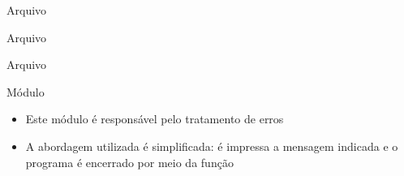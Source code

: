 \begin{frame}[fragile]{Arquivo }
\end{frame}

\begin{frame}[fragile]{Arquivo }
\end{frame}

\begin{frame}[fragile]{Arquivo }
\end{frame}

\begin{frame}[fragile]{Módulo }

    \begin{itemize}
        \item Este módulo é responsável pelo tratamento de erros

        \item A abordagem utilizada é simplificada: é impressa a mensagem indicada e o programa é encerrado por meio da função 

    \end{itemize}

\end{frame}
